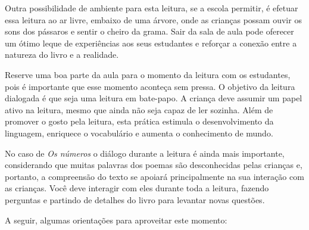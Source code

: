 \documentclass[11pt]{extarticle}
\begin{document}
Outra possibilidade de ambiente para esta leitura, se a escola permitir, 
é efetuar essa leitura ao ar livre, embaixo de uma árvore, onde as crianças 
possam ouvir os sons dos pássaros e sentir o cheiro da grama. Sair da sala 
de aula pode oferecer um ótimo leque de experiências aos seus estudantes e 
reforçar a conexão entre a natureza do livro e a realidade.  

Reserve uma boa parte da aula para o momento da leitura com os estudantes, 
pois é importante que esse momento aconteça sem pressa. O objetivo da 
leitura dialogada é que seja uma leitura em bate-papo. A criança deve 
assumir um papel ativo na leitura, mesmo que ainda não seja capaz de 
ler sozinha. Além de promover o gosto pela leitura, esta prática estimula 
o desenvolvimento da linguagem, enriquece o vocabulário e 
aumenta o conhecimento de mundo.

No caso de \textit{Os números} o diálogo durante a leitura é 
ainda mais importante, considerando que muitas palavras dos poemas são desconhecidas pelas crianças e, portanto, a compreensão do texto se apoiará principalmente na sua interação com as crianças. 
Você deve interagir com eles durante toda a 
leitura, fazendo perguntas e partindo de detalhes do livro para 
levantar novas questões. 

A seguir, algumas orientações para aproveitar este momento: 
\end{document}
